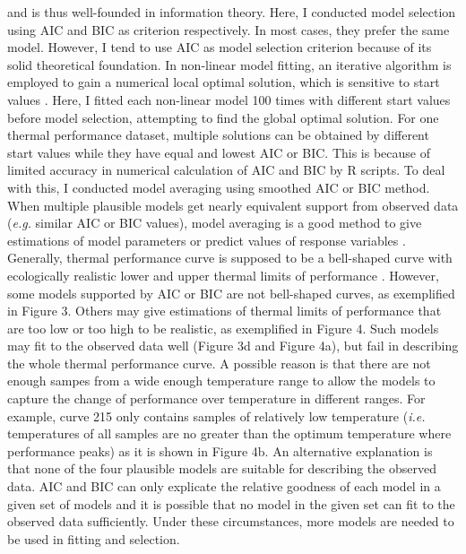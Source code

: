 \documentclass[11pt]{article}
\begin{document}
  and is thus well-founded in information theory.  
  Here, I conducted model selection using AIC and BIC as criterion respectively. 
  In most cases, they prefer the same model. However, I tend to use AIC as model selection criterion because of its solid 
  theoretical foundation.
  \newline
  In non-linear model fitting, an iterative algorithm is employed to gain a numerical local optimal solution, 
  which is sensitive to start values 
  \cite{ranganathan2004levenberg, lourakis2005brief}. 
  Here, 
  I fitted each non-linear model 100 times with different start values before model selection, attempting to 
  find the global optimal solution. For one thermal 
  performance dataset, multiple solutions can be obtained by different start values while they have equal and 
  lowest AIC or BIC. This is because of limited accuracy in numerical calculation of AIC and BIC 
  by R scripts. To deal with this, I conducted model averaging using smoothed AIC or BIC method. 
  When multiple plausible models get nearly equivalent support from observed data (\textit{e.g.} similar AIC or BIC values), 
  model averaging is a good method 
  to give estimations of model parameters or predict values of response variables \cite{johnson2004model}.
  \newline
  Generally, thermal performance curve is supposed to be a bell-shaped curve with ecologically realistic 
  lower and upper thermal limits of performance \cite{sinclair2016can,krenek2011thermal}. 
  However, some models supported by AIC or BIC are not bell-shaped curves, 
  as exemplified in Figure 3. Others may give estimations of thermal limits of performance that are too low or too high to 
  be realistic, as exemplified in Figure 4. Such models may fit to the observed data well (Figure 3d and Figure 4a), but 
  fail in describing the whole thermal performance curve. A possible reason is that there are not enough sampes from a wide 
  enough temperature range to allow the models to capture the change of performance over temperature in different ranges. 
  For example, curve 215 
  only contains samples of relatively low temperature (\textit{i.e.} temperatures of all samples are no greater 
  than the optimum 
  temperature  
  where performance peaks) as it is shown in Figure 4b. An alternative explanation is that none of the four plausible models 
  are suitable for describing the observed data. 
  AIC and BIC can only explicate the relative goodness of each model in a given set of models \cite{johnson2004model, 
  buckland1997model, zucchini2000introduction}
   and it 
  is possible that no model in the given set can fit to the observed data sufficiently. Under these circumstances, more 
  models are needed to be used in fitting and selection.
\end{document}
